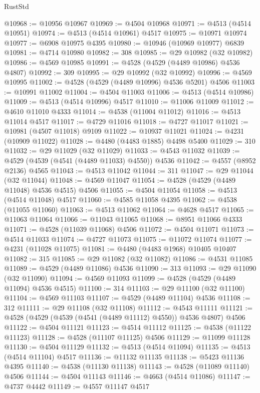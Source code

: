 \begin{lexlean}{RustStd}
\begin{coremodule}
@10968 := @10956 @10967
@10969 := @4504 @10968
@10971 := @4513 (@4514 @10951)
@10974 := @4513 (@4514 @10961) @4517
@10975 := @10971 @10974
@10977 := @6908 @10975 @4395
@10980 := @10946 (@10969 @10977) @6839
@10981 := @4714 @10980
@10982 := 308
@10985 := @29 @10982 (@32 @10982)
@10986 := @4569 @10985
@10991 := @4528 (@4529 (@4489 @10986) @4536 @4807)
@10992 := 309
@10995 := @29 @10992 (@32 @10992)
@10996 := @4569 @10995
@11002 := @4528 (@4529 (@4489 @10996) @4536 @5201) @4506
@11003 := @10991 @11002
@11004 := @4504 @11003
@11006 := @4513 (@4514 @10986)
@11009 := @4513 (@4514 @10996) @4517
@11010 := @11006 @11009
@11012 := @4610 @11010 @4333
@11014 := @4538 (@11004 @11012)
@11016 := @4513 @11014 @4517
@11017 := @4729 @11016
@11018 := @4727 @11017
@11021 := @10981 (@4507 @11018) @9109
@11022 := @10937 @11021
@11024 := @4231 (@10909 @11022)
@11028 := @4480 (@4483 @1885) @4498 @5400
@11029 := 310
@11032 := @29 @11029 (@32 @11029)
@11033 := @4543 @11032
@11039 := @4529 (@4539 (@4541 (@4489 @11033) @4550)) @4536
@11042 := @4557 (@8952 @2136) @4565
@11043 := @4513 @11042
@11044 := 311
@11047 := @29 @11044 (@32 @11044)
@11048 := @4569 @11047
@11054 := @4528 (@4529 (@4489 @11048) @4536 @4515) @4506
@11055 := @4504 @11054
@11058 := @4513 (@4514 @11048) @4517
@11060 := @4585 @11058 @4395
@11062 := @4538 (@11055 @11060)
@11063 := @4513 @11062
@11064 := @4628 @4517
@11065 := @11063 @11064
@11066 := @11043 @11065
@11068 := @8951 @11066 @4333
@11071 := @4528 (@11039 @11068) @4506
@11072 := @4504 @11071
@11073 := @4514 @11033
@11074 := @4727 @11073
@11075 := @11072 @11074
@11077 := @4231 (@11028 @11075)
@11081 := @4480 (@4483 @1968) @10405 @10407
@11082 := 315
@11085 := @29 @11082 (@32 @11082)
@11086 := @4531 @11085
@11089 := @4529 (@4489 @11086) @4536
@11090 := 313
@11093 := @29 @11090 (@32 @11090)
@11094 := @4569 @11093
@11099 := @4528 (@4529 (@4489 @11094) @4536 @4515)
@11100 := 314
@11103 := @29 @11100 (@32 @11100)
@11104 := @4569 @11103
@11107 := @4529 (@4489 @11104) @4536
@11108 := 312
@11111 := @29 @11108 (@32 @11108)
@11112 := @4543 @11111
@11121 := @4528 (@4529 (@4539 (@4541 (@4489 @11112) @4550)) @4536 @4807) @4506
@11122 := @4504 @11121
@11123 := @4514 @11112
@11125 := @4538 (@11122 @11123)
@11128 := @4528 (@11107 @11125) @4506
@11129 := @11099 @11128
@11130 := @4504 @11129
@11132 := @4513 (@4514 @11094)
@11135 := @4513 (@4514 @11104) @4517
@11136 := @11132 @11135
@11138 := @5423 @11136 @4395
@11140 := @4538 (@11130 @11138)
@11143 := @4528 (@11089 @11140) @4506
@11144 := @4504 @11143
@11146 := @4663 (@4514 @11086)
@11147 := @4737 @4442
@11149 := @4557 @11147 @4517

\end{coremodule}
\end{lexlean}
